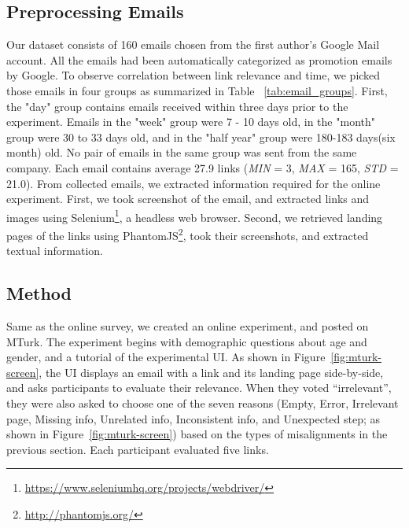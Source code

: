 \documentclass{sigchi}
\begin{document}
\subsection{Preprocessing Emails}
Our dataset consists of 160 emails chosen from the first author's Google Mail account. All the emails had been automatically categorized as promotion emails by Google. To observe correlation between link relevance and time, we picked those emails in four groups as summarized in Table ~\ref{tab:email_groups}. First, the "day" group contains emails received within three days prior to the experiment. Emails in the "week" group were 7 - 10 days old, in the "month" group were 30 to 33 days old, and in the "half year" group were 180-183 days(six month) old. No pair of emails in the same group was sent from the same company. Each email contains average 27.9 links (\textit{MIN} = 3, \textit{MAX} = 165, \textit{STD} = 21.0). From collected emails, we extracted information required for the online experiment. First, we took screenshot of the email, and extracted links and images using Selenium\footnote{\url{https://www.seleniumhq.org/projects/webdriver/}}, a headless web browser. Second, we retrieved landing pages of the links using PhantomJS\footnote{\url{http://phantomjs.org/}}, took their screenshots, and extracted textual information.    

\def\c#1{\textsf{#1}}

\subsection{Method}
Same as the online survey, we created an online experiment, and posted on MTurk. The experiment begins with demographic questions about age and gender, and a tutorial of the experimental UI. As shown in Figure~\ref{fig:mturk-screen}, the UI displays an email with a link and its landing page side-by-side, and asks participants to evaluate their relevance. When they voted ``irrelevant'', they were also asked to choose one of the seven reasons (\c{Empty}, \c{Error}, \c{Irrelevant page}, \c{Missing info}, \c{Unrelated info}, \c{Inconsistent info}, and \c{Unexpected step}; as shown in Figure~\ref{fig:mturk-screen}) based on the types of misalignments in the previous section. Each participant evaluated five links.     

\end{document}
